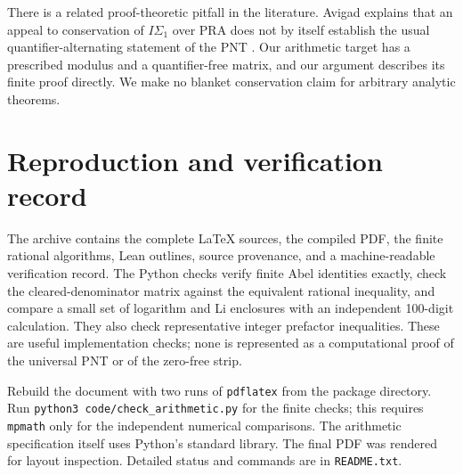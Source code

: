 There is a related proof-theoretic pitfall in the literature. Avigad
explains that an appeal to conservation of $I\Sigma_1$ over PRA does not
by itself establish the usual quantifier-alternating statement of the
PNT \cite[footnote 14]{Avigad}. Our arithmetic target has a prescribed
modulus and a quantifier-free matrix, and our argument describes its
finite proof directly. We make no blanket conservation claim for arbitrary
analytic theorems.

\section{Reproduction and verification record}

The archive contains the complete LaTeX sources, the compiled PDF,
the finite rational algorithms, Lean outlines, source provenance, and a
machine-readable verification record. The Python checks verify finite
Abel identities exactly, check the cleared-denominator matrix against
the equivalent rational inequality, and compare a small set of logarithm
and Li enclosures with an independent 100-digit calculation. They also
check representative integer prefactor inequalities. These are useful
implementation checks; none is represented as a computational proof of
the universal PNT or of the zero-free strip.

Rebuild the document with two runs of \texttt{pdflatex} from the package
directory. Run \texttt{python3 code/check\_arithmetic.py} for the finite
checks; this requires \texttt{mpmath} only for the independent numerical
comparisons. The arithmetic specification itself uses Python's standard
library. The final PDF was rendered for layout inspection. Detailed
status and commands are in \texttt{README.txt}.
